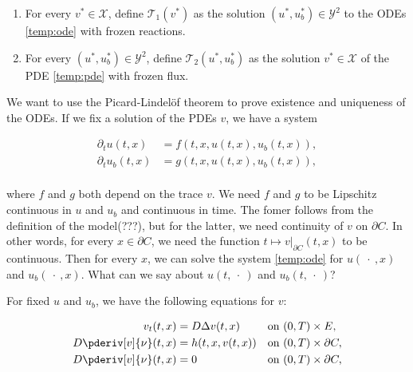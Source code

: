 \begin{enumerate}
    \item For every $v^* \in \mathcal{X}$, define $\mathcal{T}_1 (v^*)$ as the solution $(u^*, u_b^*) \in \mathcal{Y}^2$ to the ODEs \ref{temp:ode} with frozen reactions.
    \item For every $(u^*, u_b^*) \in \mathcal{Y}^2$, define $\mathcal{T}_2 (u^*, u_b^*)$ as the solution $v^* \in \mathcal{X}$ of the PDE \ref{temp:pde} with frozen flux.
\end{enumerate}

We want to use the Picard-Lindel\"of theorem to prove existence and uniqueness of the ODEs. If we fix a solution of the PDEs $v$, we have a system

\begin{equation}
    \label{temp:ode}
    \begin{aligned}
        \partial_t u(t,x)    &= f(t, x, u(t,x), u_b(t,x)), \\
        \partial_t u_b(t,x)  &= g(t, x, u(t,x), u_b(t,x)), \\
    \end{aligned}
\end{equation}

\noindent
where $f$ and $g$ both depend on the trace $v$. We need $f$ and $g$ to be Lipschitz continuous in $u$ and $u_b$ and continuous in time. The fomer follows from the definition of the model(???), but for the latter, we need continuity of $v$ on $\partial C$. In other words, for every $x \in \partial C$, we need the function $t \mapsto v \vert_{\partial C}(t, x)$ to be continuous. Then for every $x$, we can solve the system \ref{temp:ode} for $u(\ \cdot\ , x)$ and $u_b(\ \cdot\ , x)$. What can we say about $u(t,\ \cdot\ )$ and $u_b(t,\ \cdot\ )$?

For fixed $u$ and $u_b$, we have the following equations for $v$:

\begin{equation}
    \label{temp:pde}
    \begin{aligned}
        v_t(t, x) &= D\Delta v(t, x) && \text{on } (0, T) \times E,\\
        D \pderiv[v]{\nu}(t, x) &= h(t, x, v(t, x)) && \text{on } (0, T) \times \partial C,\\
        D \pderiv[v]{\nu}(t, x) &= 0 && \text{on } (0, T) \times \partial C,\\
    \end{aligned}
\end{equation}

